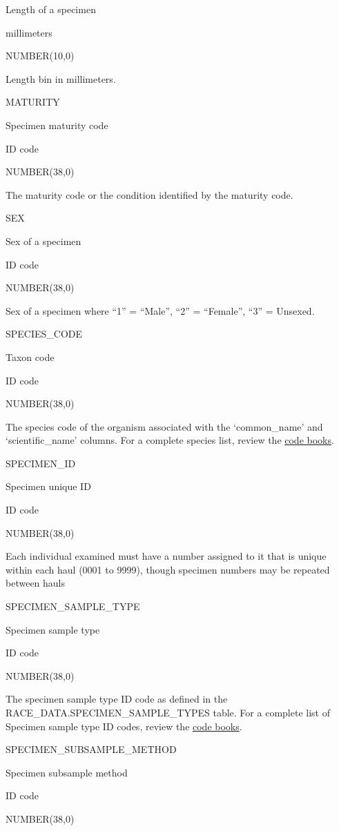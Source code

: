 \documentclass[
  letterpaper,
  oneside,
  open=any]{scrbook}
\begin{document}
Length of a specimen

millimeters

NUMBER(10,0)

Length bin in millimeters.

MATURITY

Specimen maturity code

ID code

NUMBER(38,0)

The maturity code or the condition identified by the maturity code.

SEX

Sex of a specimen

ID code

NUMBER(38,0)

Sex of a specimen where ``1'' = ``Male'', ``2'' = ``Female'', ``3'' =
Unsexed.

SPECIES\_CODE

Taxon code

ID code

NUMBER(38,0)

The species code of the organism associated with the `common\_name' and
`scientific\_name' columns. For a complete species list, review the
\href{https://www.fisheries.noaa.gov/resource/document/groundfish-survey-species-code-manual-and-data-codes-manual}{code
books}.

SPECIMEN\_ID

Specimen unique ID

ID code

NUMBER(38,0)

Each individual examined must have a number assigned to it that is
unique within each haul (0001 to 9999), though specimen numbers may be
repeated between hauls

SPECIMEN\_SAMPLE\_TYPE

Specimen sample type

ID code

NUMBER(38,0)

The specimen sample type ID code as defined in the
RACE\_DATA.SPECIMEN\_SAMPLE\_TYPES table. For a complete list of
Specimen sample type ID codes, review the
\href{https://www.fisheries.noaa.gov/resource/document/groundfish-survey-species-code-manual-and-data-codes-manual}{code
books}.

SPECIMEN\_SUBSAMPLE\_METHOD

Specimen subsample method

ID code

NUMBER(38,0)
\end{document}
